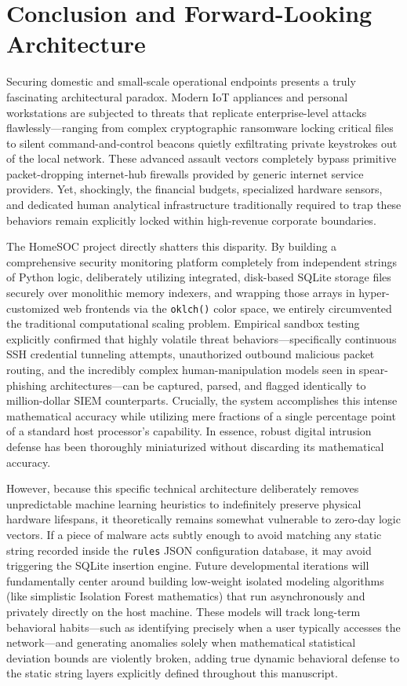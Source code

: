\documentclass[conference]{IEEEtran}
\begin{document}
\section{Conclusion and Forward-Looking Architecture}

Securing domestic and small-scale operational endpoints presents a truly fascinating architectural paradox. Modern IoT appliances and personal workstations are subjected to threats that replicate enterprise-level attacks flawlessly—ranging from complex cryptographic ransomware locking critical files to silent command-and-control beacons quietly exfiltrating private keystrokes out of the local network. These advanced assault vectors completely bypass primitive packet-dropping internet-hub firewalls provided by generic internet service providers. Yet, shockingly, the financial budgets, specialized hardware sensors, and dedicated human analytical infrastructure traditionally required to trap these behaviors remain explicitly locked within high-revenue corporate boundaries. 

The HomeSOC project directly shatters this disparity. By building a comprehensive security monitoring platform completely from independent strings of Python logic, deliberately utilizing integrated, disk-based SQLite storage files securely over monolithic memory indexers, and wrapping those arrays in hyper-customized web frontends via the \verb|oklch()| color space, we entirely circumvented the traditional computational scaling problem. Empirical sandbox testing explicitly confirmed that highly volatile threat behaviors—specifically continuous SSH credential tunneling attempts, unauthorized outbound malicious packet routing, and the incredibly complex human-manipulation models seen in spear-phishing architectures—can be captured, parsed, and flagged identically to million-dollar SIEM counterparts. Crucially, the system accomplishes this intense mathematical accuracy while utilizing mere fractions of a single percentage point of a standard host processor's capability. In essence, robust digital intrusion defense has been thoroughly miniaturized without discarding its mathematical accuracy. 

However, because this specific technical architecture deliberately removes unpredictable machine learning heuristics to indefinitely preserve physical hardware lifespans, it theoretically remains somewhat vulnerable to zero-day logic vectors. If a piece of malware acts subtly enough to avoid matching any static string recorded inside the \verb|rules| JSON configuration database, it may avoid triggering the SQLite insertion engine. Future developmental iterations will fundamentally center around building low-weight isolated modeling algorithms (like simplistic Isolation Forest mathematics) that run asynchronously and privately directly on the host machine. These models will track long-term behavioral habits—such as identifying precisely when a user typically accesses the network—and generating anomalies solely when mathematical statistical deviation bounds are violently broken, adding true dynamic behavioral defense to the static string layers explicitly defined throughout this manuscript.
\end{document}
